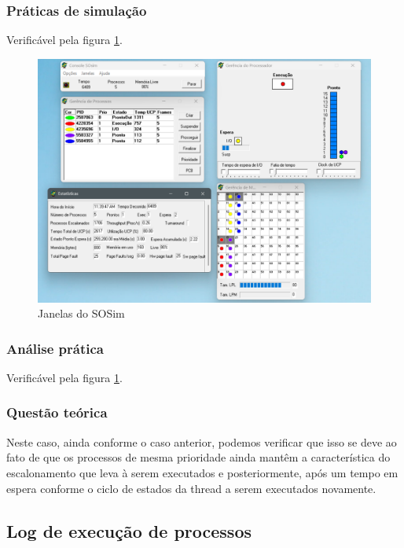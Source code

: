 \documentclass[a4paper,12pt]{article} %
\begin{document}
\subsubsection[]{Práticas de simulação}
Verificável pela figura \ref{fig6}.
\begin{figure}[htbp]
    \centering
    \includegraphics[scale=0.4]{../fig/fig6.png}
    \caption{Janelas do SOSim}
    \label{fig6}
\end{figure}
\subsubsection[]{Análise prática}
Verificável pela figura \ref{fig6}.
\subsubsection[]{Questão teórica}
Neste caso, ainda conforme o caso anterior, podemos verificar que isso se deve ao fato de que os processos de mesma prioridade
ainda mantêm a característica do escalonamento que leva à serem executados e posteriormente, após um tempo em espera conforme
o ciclo de estados da thread a serem executados novamente.
\subsection[]{Log de execução de processos}
\end{document}
